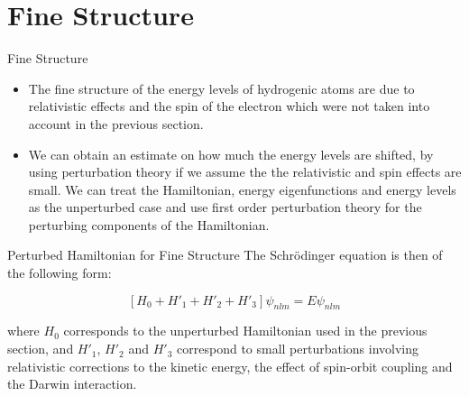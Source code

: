 \documentclass[aspectratio=1610,xcolor=dvipsnames,t]{beamer}
\begin{document}

\section{Fine Structure}
    \begin{frame}{Fine Structure} 

    \begin{itemize} 

    \item The fine structure of the energy levels of hydrogenic atoms are due to relativistic
    effects and the spin of the electron which were not taken into account in the previous
    section. 
    
    \item We can obtain an estimate on how much the energy levels are shifted, by 
    using perturbation theory if we assume the the relativistic and spin effects are 
    small. We can treat the Hamiltonian, energy eigenfunctions and energy levels as
    the unperturbed case and use first order perturbation theory for the perturbing
    components of the Hamiltonian. 
    \end{itemize} 
    \end{frame} 

    \begin{frame}{Perturbed Hamiltonian for Fine Structure} 
    The Schr\"odinger equation is then of the following form:

    \begin{equation} 
        \left[ H_0 + H'_1 + H'_2 + H'_3 \right] \psi_{nlm} = E \psi_{nlm}
    \end{equation} 

    where $H_0$ corresponds to the unperturbed Hamiltonian used in the previous section,
    and $H'_1$, $H'_2$ and $H'_3$ correspond to small perturbations involving relativistic
    corrections to the kinetic energy, the effect of spin-orbit coupling and the Darwin
    interaction. 
    \end{frame} 
    
\end{document}
